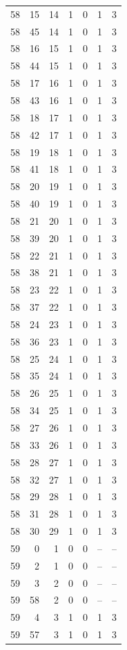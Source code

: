 \begin{longtable}{rrrrrrr}
58 & 15 & 14 & 1 & 0 & 1 & 3\\
58 & 45 & 14 & 1 & 0 & 1 & 3\\
58 & 16 & 15 & 1 & 0 & 1 & 3\\
58 & 44 & 15 & 1 & 0 & 1 & 3\\
58 & 17 & 16 & 1 & 0 & 1 & 3\\
58 & 43 & 16 & 1 & 0 & 1 & 3\\
58 & 18 & 17 & 1 & 0 & 1 & 3\\
58 & 42 & 17 & 1 & 0 & 1 & 3\\
58 & 19 & 18 & 1 & 0 & 1 & 3\\
58 & 41 & 18 & 1 & 0 & 1 & 3\\
58 & 20 & 19 & 1 & 0 & 1 & 3\\
58 & 40 & 19 & 1 & 0 & 1 & 3\\
58 & 21 & 20 & 1 & 0 & 1 & 3\\
58 & 39 & 20 & 1 & 0 & 1 & 3\\
58 & 22 & 21 & 1 & 0 & 1 & 3\\
58 & 38 & 21 & 1 & 0 & 1 & 3\\
58 & 23 & 22 & 1 & 0 & 1 & 3\\
58 & 37 & 22 & 1 & 0 & 1 & 3\\
58 & 24 & 23 & 1 & 0 & 1 & 3\\
58 & 36 & 23 & 1 & 0 & 1 & 3\\
58 & 25 & 24 & 1 & 0 & 1 & 3\\
58 & 35 & 24 & 1 & 0 & 1 & 3\\
58 & 26 & 25 & 1 & 0 & 1 & 3\\
58 & 34 & 25 & 1 & 0 & 1 & 3\\
58 & 27 & 26 & 1 & 0 & 1 & 3\\
58 & 33 & 26 & 1 & 0 & 1 & 3\\
58 & 28 & 27 & 1 & 0 & 1 & 3\\
58 & 32 & 27 & 1 & 0 & 1 & 3\\
58 & 29 & 28 & 1 & 0 & 1 & 3\\
58 & 31 & 28 & 1 & 0 & 1 & 3\\
58 & 30 & 29 & 1 & 0 & 1 & 3\\
59 & 0 & 1 & 0 & 0 & -- & --\\
59 & 2 & 1 & 0 & 0 & -- & --\\
59 & 3 & 2 & 0 & 0 & -- & --\\
59 & 58 & 2 & 0 & 0 & -- & --\\
59 & 4 & 3 & 1 & 0 & 1 & 3\\
59 & 57 & 3 & 1 & 0 & 1 & 3\\

\end{longtable}
